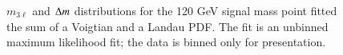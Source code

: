 \begin{figure}[H!]
\begin{minipage}[c]{\textwidth}
  \centering
  \caption{$m_{3\ell}$ and $\Delta m$ distributions for the 120 GeV signal mass point fitted the sum of a Voigtian and a Landau PDF. The fit is an unbinned maximum likelihood fit; the data is binned only for presentation.}
  \label{fig:SigFit}
 \subfloat[$m_{3\ell}$ ] {
}
\end{minipage}
\end{figure}
